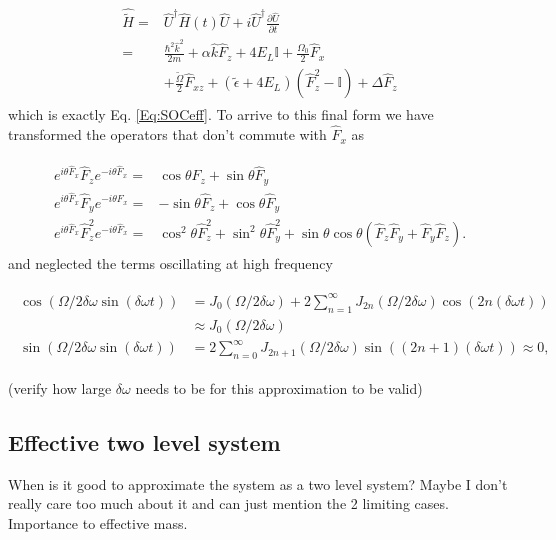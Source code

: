 \begin{align}
	\begin{split}
		\hat{\tilde{H}} = & \hat{U}^{\dagger}\hat{H}(t)\hat{U} + i\hat{U}^{\dagger} \frac{\partial\hat{U}}{\partial t} \\
		 = &\frac{\hbar^2\hat{k}^2}{2m} + \alpha\hat{k}\hat{F}_z +4E_L\mathbb{I} + \frac{\Omega_0}{2}\hat{F}_x \\
		&+ \frac{\tilde{\Omega}}{2}\hat{F}_{xz} +(\tilde{\epsilon}+4E_L)(\hat{F}_z^2-\mathbb{I}) +\Delta\hat{F}_z 	
	\end{split}
\end{align}
%
%
which is exactly Eq. \ref{Eq:SOCeff}. To arrive to this final form we have transformed the operators that don't commute with $\hat{F}_x$ as

%
\begin{align}
	\begin{split}
		e^{i\theta \hat{F}_x} \hat{F}_z e^{-i\theta \hat{F}_x}=& \cos\theta \hat{F}_z + \sin\theta\hat{F}_y \\
		e^{i\theta \hat{F}_x} \hat{F}_y e^{-i\theta \hat{F}_x} =& -\sin\theta\hat{F}_z +\cos\theta\hat{F}_y \\
		e^{i\theta \hat{F}_x} \hat{F}_z^2 e^{-i\theta \hat{F}_x} = &\cos^2\theta\hat{F}_z^2+\sin^2\theta\hat{F}_y^2 + \sin\theta\cos\theta(\hat{F}_z\hat{F}_y + \hat{F}_y\hat{F}_z).
	\end{split}
\end{align}
%
and neglected the terms oscillating at high frequency

\begin{align}
	\begin{split}
	\cos(\Omega/2\delta\omega\sin(\delta\omega t))&= J_0(\Omega/2\delta\omega) + 2\sum_{n=1}^{\infty}J_{2n}(\Omega/2\delta\omega)\cos(2n(\delta\omega t)) \\
	& \approx J_0(\Omega/2\delta\omega) \\
	\sin(\Omega/2\delta\omega\sin(\delta\omega t))&= 2\sum_{n=0}^{\infty}J_{2n+1}(\Omega/2\delta\omega)\sin((2n+1)(\delta\omega t)) \approx 0,
	\end{split}
\end{align} 


(verify how large $\delta\omega$ needs to be for this approximation to be valid)
%
%
 
\subsection{Effective two level system}
When is it good to approximate the system as a two level system? Maybe I don't really care too much about it and can just mention the 2 limiting cases.  Importance to effective mass. 

